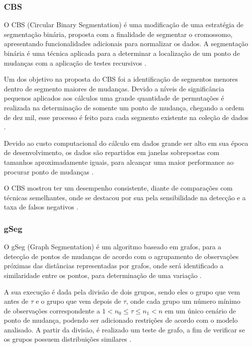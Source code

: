 \subsubsection{CBS}

O CBS (Circular Binary Segmentation) é uma modificação de uma estratégia de segmentação binária, proposta com a finalidade de segmentar o cromossomo, apresentando funcionalidades adicionais para normalizar os dados. A segmentação binária é uma técnica aplicada para a determinar a localização de um ponto de mudanças com a aplicação de testes recursivos \cite{Olshen2004}.

Um dos objetivo na proposta do CBS foi a identificação de segmentos menores dentro de segmento maiores de mudanças. Devido a níveis de significância pequenos aplicados aos cálculos uma grande quantidade de permutações é realizada na determinação de somente um ponto de mudança, chegando a ordem de dez mil, esse processo é feito para cada segmento existente na coleção de dados \cite{Olshen2004}.

Devido ao custo computacional do cálculo em dados grande ser alto em sua época de desenvolvimento, os dados são repartidos em janelas sobrepostas com tamanhos aproximadamente iguais, para alcançar uma maior performance ao procurar ponto de mudanças \cite{Olshen2004}.

O CBS mostrou ter um desempenho consistente, diante de comparações com técnicas semelhantes, onde se destacou por sua pela sensibilidade na detecção e a taxa de falsos negativos \cite{Hsu2011}.


\subsubsection{gSeg}

O gSeg (Graph Segmentation) é um algoritmo baseado em grafos, para a detecção de pontos de mudanças de acordo com o agrupamento de observações próximas das distâncias representadas por grafos, onde será identificado a similaridade entre os pontos, para determinação de uma variação 
\cite{Chen2015}. 

A sua execução é dada pela divisão de dois grupos, sendo eles o grupo que vem antes de $\tau$ e o grupo que vem depois de $\tau$, onde cada grupo um número mínimo de observações correspondente a $1 < n_{0} \leq \tau \leq n_{1} < n$ em um único cenário de ponto de mudança, podendo ser adicionado restrições de acordo com o modelo analisado. A partir da divisão, é realizado um teste de grafo, a fim de verificar se os grupos possuem distribuições similares \cite{Chen2015}. 

